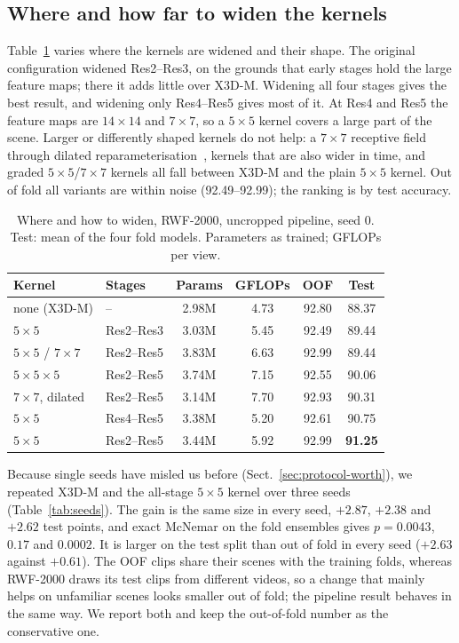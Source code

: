 \documentclass[runningheads]{llncs}
\begin{document}
\subsection{Where and how far to widen the kernels}
\label{sec:kernels}

Table~\ref{tab:placement} varies where the kernels are widened and their
shape. The original configuration widened Res2--Res3, on the grounds that
early stages hold the large feature maps; there it adds little over X3D-M.
Widening all four stages gives the best result, and widening only
Res4--Res5 gives most of it. At Res4 and Res5 the feature maps are
$14\times14$ and $7\times7$, so a $5\times5$ kernel covers a large part of
the scene. Larger or differently shaped kernels do not help: a $7\times7$
receptive field through dilated reparameterisation~\cite{unireplknet},
kernels that are also wider in time, and graded $5\times5$/$7\times7$
kernels all fall between X3D-M and the plain $5\times5$ kernel. Out of fold
all variants are within noise (92.49--92.99); the ranking is by test
accuracy.

\begin{table}[t]
\centering
\caption{Where and how to widen, RWF-2000, uncropped pipeline, seed 0.
Test: mean of the four fold models. Parameters as trained; GFLOPs per view.}
\label{tab:placement}
\setlength{\tabcolsep}{5pt}
\begin{tabular}{llcccc}
\toprule
Kernel & Stages & Params & GFLOPs & OOF & Test \\
\midrule
none (X3D-M)                & --         & 2.98M & 4.73 & 92.80 & 88.37 \\
$5\times5$                  & Res2--Res3 & 3.03M & 5.45 & 92.49 & 89.44 \\
$5\times5$ / $7\times7$     & Res2--Res5 & 3.83M & 6.63 & 92.99 & 89.44 \\
$5\times5\times5$           & Res2--Res5 & 3.74M & 7.15 & 92.55 & 90.06 \\
$7\times7$, dilated         & Res2--Res5 & 3.14M & 7.70 & 92.93 & 90.31 \\
$5\times5$                  & Res4--Res5 & 3.38M & 5.20 & 92.61 & 90.75 \\
$5\times5$                  & Res2--Res5 & 3.44M & 5.92 & 92.99 & \textbf{91.25} \\
\bottomrule
\end{tabular}
\end{table}

Because single seeds have misled us before (Sect.~\ref{sec:protocol-worth}),
we repeated X3D-M and the all-stage $5\times5$ kernel over three seeds
(Table~\ref{tab:seeds}). The gain is the same size in every seed, $+2.87$,
$+2.38$ and $+2.62$ test points, and exact McNemar on the fold ensembles
gives $p=0.0043$, $0.17$ and $0.0002$. It is larger on the test split than
out of fold in every seed ($+2.63$ against $+0.61$). The OOF clips share
their scenes with the training folds, whereas RWF-2000 draws its test clips
from different videos, so a change that mainly helps on unfamiliar scenes
looks smaller out of fold; the pipeline result behaves in the same way. We
report both and keep the out-of-fold number as the conservative one.
\end{document}
